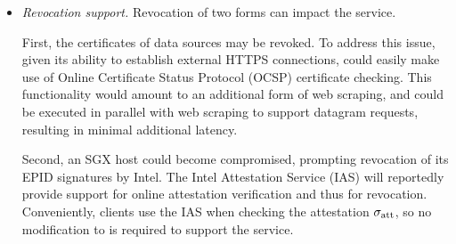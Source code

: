 \begin{itemize}
\item{\em Revocation support.} Revocation of two forms can impact the \tc service. 

First, the certificates of data sources may be revoked. To address this issue, given its ability to establish external HTTPS connections, \tc could easily make use of Online Certificate Status Protocol (OCSP) certificate checking. This functionality would amount to an additional form of web scraping, and could be executed in parallel with web scraping to support datagram requests, resulting in minimal additional latency.

Second, an SGX host could become compromised, prompting revocation of its EPID signatures by Intel. The Intel Attestation Service (IAS) will reportedly provide support for online attestation verification and thus for revocation. Conveniently, clients use the IAS when checking the attestation ${\sigma_{\textrm{att}}}$, so no modification to \tc is required to support the service.


\end{itemize}
